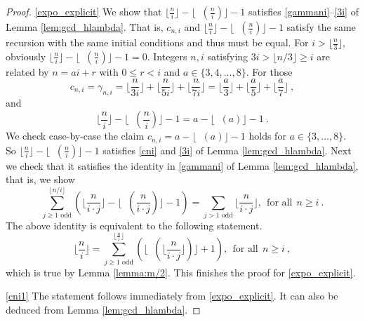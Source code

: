 \documentclass[reqno]{amsart}
\def\e{\gamma}
\DeclareMathOperator{\lb}{\log_2}
\theoremstyle{definition}
\begin{document}
\begin{proof} 
\ref{expo_explicit} We show that $\lfloor\frac{n}{i}\rfloor-\lfloor\lb(\frac{n}{i})\rfloor-1$ satisfies \ref{gammani}--\ref{3i} of Lemma \ref{lem:gcd_hlambda}. That is, $c_{n,i}$ and $\lfloor\frac{n}{i}\rfloor-\lfloor\lb(\frac{n}{i})\rfloor-1$ satisfy the same recursion with the same initial conditions and thus must be equal.  For $i>\lfloor\frac{n}{3}\rfloor$, obviously $\lfloor\frac{n}{i}\rfloor-\lfloor\lb(\frac{n}{i})\rfloor-1=0$. Integers $n,i$ satisfying  $3i>\lfloor n/3\rfloor\geq i$ are related by $n=ai+r$ with $0\leq r<i$ and $a\in\{3,4,\ldots,8\}$. For those
\[c_{n,i}=\e_{n,i}=\lfloor\frac{n}{3i}\rfloor+\lfloor\frac{n}{5i}\rfloor+\lfloor\frac{n}{7i}\rfloor=\lfloor\frac{a}{3}\rfloor+\lfloor\frac{a}{5}\rfloor+\lfloor\frac{a}{7}\rfloor\:,\]
and 
\[\lfloor\frac{n}{i}\rfloor-\lfloor\lb(\frac{n}{i})\rfloor-1=a-\lfloor\lb(a)\rfloor-1\:.\]
We check case-by-case  the claim $c_{n,i}=a-\lfloor\lb(a)\rfloor-1$ holds for $a\in\{3,\ldots,8\}$.
So $\lfloor\frac{n}{i}\rfloor-\lfloor\lb(\frac{n}{i})\rfloor-1$ satisfies \ref{cni} and \ref{3i} of Lemma \ref{lem:gcd_hlambda}.
Next we check that it satisfies the identity  in \ref{gammani} of Lemma \ref{lem:gcd_hlambda}, that is, we show 
\begin{equation*}\sum_{j\geq 1 \textrm{ odd}}^{ \lfloor n/i \rfloor }(\lfloor\frac{n}{i\cdot j}\rfloor-\lfloor\lb(\frac{n}{i\cdot j})\rfloor-1)=\sum_{j>1 \textrm{ odd}}\lfloor\frac{n}{i\cdot j}\rfloor, \ \ \text{for all}\ \  n\geq i\:.\end{equation*} 
The above identity is equivalent to  the following statement.   
\[\lfloor\frac{n}{i}\rfloor=\sum_{j\geq 1\textrm{ odd}}^{\lfloor\frac{n}{i}\rfloor}(\lfloor\lb(\lfloor\frac{n}{i\cdot j}\rfloor)\rfloor+1), \ \ \text{for all}\ \  n\geq i\:,\]
which is true by Lemma \ref{lemma:m/2}.
This finishes the proof for \ref{expo_explicit}.

    \ref{cni1}   The statement follows immediately  from \ref{expo_explicit}. It can also be deduced    from Lemma \ref{lem:gcd_hlambda}.
\end{proof}
\end{document}
